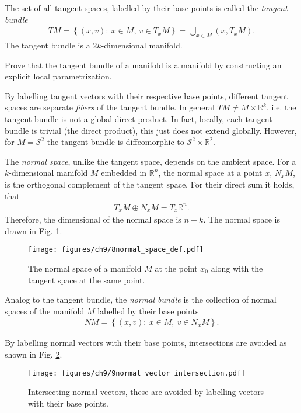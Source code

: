 \begin{definition}
	The set of all tangent spaces, labelled by their base points is called the \emph{tangent bundle}
	\begin{align}
		\boxed{
			TM = \left\{ (x,v):\ x\in M,\ v\in T_{x}M \right\} = \bigcup_{x\in M}(x, T_{x}M).
		}
	\end{align}
The tangent bundle is a $2k$-dimensional manifold.	
\end{definition}

\begin{exercise}
Prove that the tangent bundle of a manifold is a manifold by constructing an explicit local parametrization.
\end{exercise}

By labelling tangent vectors with their respective base points, different tangent spaces are separate \emph{fibers} of the tangent bundle. In general $TM \neq M \times \mathbb{R}^{k}$, i.e. the tangent bundle is not a global direct product. In fact, locally, each tangent bundle is trivial (the direct product), this just does not extend globally. However, for $M=\mathcal{S}^{2}$ the tangent bundle is diffeomorphic to $\mathcal{S}^{2} \times \mathbb{R}^{2}$. 

\begin{definition}
	The \emph{normal space}, unlike the tangent space, depends on the ambient space. For a $k$-dimensional manifold $M$ embedded in $\mathbb{R}^{n}$, the normal space at a point $x$, $N_{x}M$, is the orthogonal complement of the tangent space. For their direct sum it holds, that 
	\begin{align}
		\boxed{
			T_{x}M \oplus N_{x}M = T_{x}\mathbb{R}^{n}.
		}
	\end{align}
	Therefore, the dimensional of the normal space is $n-k$. The normal space is drawn in Fig. \ref{fig:normal_space_def}.	
	\begin{figure}[h!]
		\centering
		\texttt{[image: figures/ch9/8normal\_space\_def.pdf]}
		\caption{The normal space of a manifold $M$ at the point $x_0$ along with the tangent space at the same point.}
		\label{fig:normal_space_def}
	\end{figure}
\end{definition}

\begin{definition}
	Analog to the tangent bundle, the \emph{normal bundle} is the collection of normal spaces of the manifold $M$ labelled by their base points
	\begin{align}
	\boxed{
		NM = \left\{ (x,v):\ x\in M,\ v\in N_{x}M \right\}.
	}
	\end{align}
\end{definition}
By labelling normal vectors with their base points, intersections are avoided as shown in Fig. \ref{fig:normal_vector_intersection}.
\begin{figure}[h!]
	\centering
	\texttt{[image: figures/ch9/9normal\_vector\_intersection.pdf]}
	\caption{Intersecting normal vectors, these are avoided by labelling vectors with their base points.}
	\label{fig:normal_vector_intersection}
\end{figure}

